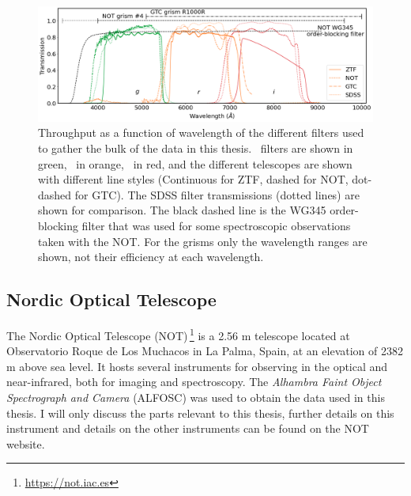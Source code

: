 \documentclass[a4paper,oneside,12pt, class=Latex/Classes/PhDthesisPSnPDF, crop=false]{standalone}
\begin{document}
\begin{figure}
    \centering
    \includegraphics[width=\textwidth]{../Images/chapter_2/transmissions.png}
    \caption[Throughput of different filters and grisms used in this thesis.]{Throughput as a function of wavelength of the different filters used to gather the bulk of the data in this thesis. \ztfg\ filters are shown in green, \ztfr\ in orange, \ztfi\ in red, and the different telescopes are shown with different line styles (Continuous for ZTF, dashed for NOT, dot-dashed for GTC). The SDSS filter transmissions (dotted lines) are shown for comparison. The black dashed line is the WG345 order-blocking filter that was used for some spectroscopic observations taken with the NOT. For the grisms only the wavelength ranges are shown, not their efficiency at each wavelength.}
    \label{Optical_elements_plot}
\end{figure}


\subsection{Nordic Optical Telescope}
\label{NOT}
The Nordic Optical Telescope (NOT)\,\footnote{\url{https://not.iac.es}} is a 2.56 m telescope located at Observatorio Roque de Los Muchacos in La Palma, Spain, at an elevation of 2382 m above sea level. It hosts several instruments for observing in the optical and near-infrared, both for imaging and spectroscopy. The \textit{Alhambra Faint Object Spectrograph and Camera} (ALFOSC) was used to obtain the data used in this thesis. I will only discuss the parts relevant to this thesis, further details on this instrument and details on the other instruments can be found on the NOT website.
\end{document}

